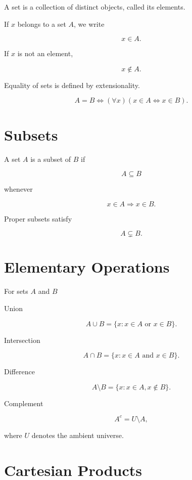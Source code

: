 \documentclass[11pt,fleqn]{book}
\numberwithin{equation}{chapter}
\theoremstyle{plain}
\theoremstyle{definition}
\theoremstyle{remark}
\begin{document}
A set is a collection of distinct objects, called its elements.

If $x$ belongs to a set $A$, we write

\[
x\in A.
\]

If $x$ is not an element,

\[
x\notin A.
\]

Equality of sets is defined by extensionality.

\[
A=B
\iff
(\forall x)(x\in A \Leftrightarrow x\in B).
\]


\section{Subsets}

A set $A$ is a subset of $B$ if

\[
A\subseteq B
\]

whenever

\[
x\in A
\Longrightarrow
x\in B.
\]

Proper subsets satisfy

\[
A\subsetneq B.
\]


\section{Elementary Operations}

For sets $A$ and $B$

Union

\[
A\cup B
=
\{x:x\in A
\text{ or }
x\in B\}.
\]

Intersection

\[
A\cap B
=
\{x:x\in A
\text{ and }
x\in B\}.
\]

Difference

\[
A\setminus B
=
\{x:x\in A,x\notin B\}.
\]

Complement

\[
A^c
=
U\setminus A,
\]

where $U$ denotes the ambient universe.


\section{Cartesian Products}
\end{document}

